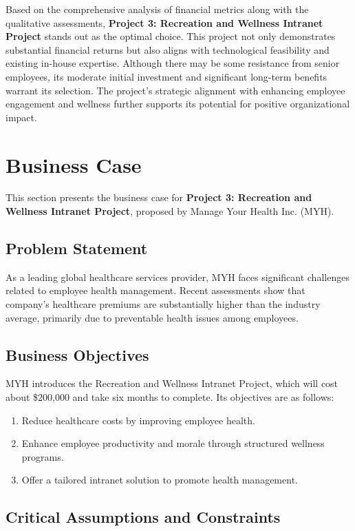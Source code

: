 Based on the comprehensive analysis of financial metrics along with the qualitative assessments, \textbf{Project 3: Recreation and Wellness Intranet Project} stands out as the optimal choice. This project not only demonstrates substantial financial returns but also aligns with technological feasibility and existing in-house expertise. Although there may be some resistance from senior employees, its moderate initial investment and significant long-term benefits warrant its selection. The project's strategic alignment with enhancing employee engagement and wellness further supports its potential for positive organizational impact.


\section{Business Case}
This section presents the business case for \textbf{Project 3: Recreation and Wellness Intranet Project}, proposed by Manage Your Health Inc. (MYH). 

\subsection{Problem Statement}

As a leading global healthcare services provider, MYH faces significant challenges related to employee health management. Recent assessments show that company's healthcare premiums are substantially higher than the industry average, primarily due to preventable health issues among employees.

\subsection{Business Objectives}

MYH introduces the Recreation and Wellness Intranet Project, which will cost about 
\$200,000 and take six months to complete. Its objectives are as follows:

\begin{enumerate}
    \item Reduce healthcare costs by improving employee health.
    \item Enhance employee productivity and morale through structured wellness programs.
    \item Offer a tailored intranet solution to promote health management.
\end{enumerate}

\subsection{Critical Assumptions and Constraints}

